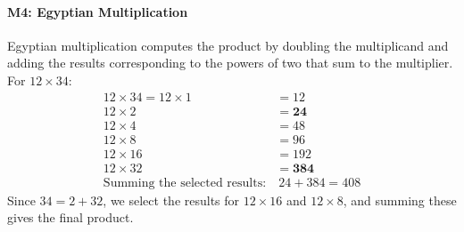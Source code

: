 \documentclass[11pt]{article}
\begin{document}
\paragraph{M4: Egyptian Multiplication}
Egyptian multiplication computes the product by doubling the multiplicand and adding the results corresponding to the powers of two that sum to the multiplier. For \(12 \times 34\):
\begin{align*}
12 \times 34 = 12 \times 1 &= 12 \\
12 \times 2 &= \mathbf{24} \\
12 \times 4 &= 48 \\
12 \times 8 &= 96 \\
12 \times 16 &= 192 \\
12 \times 32 &= \mathbf{384} \\
\text{Summing the selected results:} &\ 24 + 384 = 408
\end{align*}
Since \(34 = 2 + 32\), we select the results for \(12 \times 16\) and \(12 \times 8\), and summing these gives the final product.
\begin{table}[t]
\vspace{-0.5cm}
\vspace{-0.2cm}

\centering
\small
{}
\caption{Inductive and deductive accuracy difference $\Delta$.}
\label{tab:partial-products}
\end{table}
\end{document}
